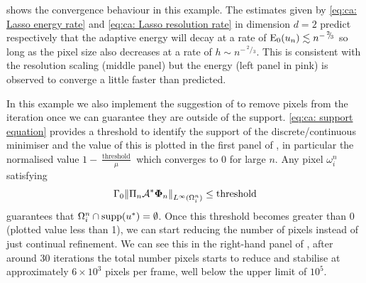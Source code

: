 \documentclass[10pt,a4paper,onecolumn]{article}
\numberwithin{equation}{section}
\newcommand{\norm}[1]{{\left\lVert #1 \right\rVert}}
\renewcommand{\sfrac}[2]{\,^{#1}\!\!/\!_{#2}}
\newcommand{\op}[1]{\operatorname{#1}}\newcommand{\overtext}[2]{\stackrel{\text{#1}}{#2}}
\renewcommand{\vec}{\mathbf}
\newcommand*{\Func}[1]{%
	\IfEqCase{#1}{%
		{0}{\op{E}}%
		{1}{\op{F}}%
		{2}{\op{G}}%
		{3}{\op{H}}%
	}[\op{F}#1]%
}
\newcommand*{\varf}[1]{%
	\IfEqCase{#1}{%
		{0}{u}%
		{1}{v}%
		{2}{w}%
	}[u#1]%
}
\newcommand*{\vard}[1]{%
	\IfEqCase{#1}{%
		{0}{\varphi}%
		{1}{\psi}%
	}[\varphi #1]%
}
\newcommand*{\vars}[1]{%
	\IfEqCase{#1}{%
		{0}{\alpha}%
		{1}{\beta}%
		{2}{\gamma}%
		{3}{a}%
		{4}{b}%
		{5}{c}%
	}[k#1]%
}
\newcommand*{\data}[1]{%
	\IfEqCase{#1}{%
		{0}{\eta}%
		{1}{\nu}%
	}[g]%
}
\newcommand{\domain}{\omega}
\newcommand{\meshsize}{h}
\newcommand*{\vvard}[1]{\vec{\vard{#1}}}\newcommand*{\vdata}[1]{\vec{\data{#1}}}
\begin{document}
 shows the convergence behaviour in this example. The estimates given by \eqref{eq:ca: Lasso energy rate} and \eqref{eq:ca: Lasso resolution rate} in dimension $d=2$ predict respectively that the adaptive energy will decay at a rate of $\Func0_0(\varf0_n)\lesssim n^{-\sfrac23}$ so long as the pixel size also decreases at a rate of $\meshsize\sim n^{-\sfrac23}$. This is consistent with the resolution scaling (middle panel) but the energy (left panel in pink) is observed to converge a little faster than predicted. 

In this example we also implement the suggestion of  to remove pixels from the iteration once we can guarantee they are outside of the support. \eqref{eq:ca: support equation} provides a threshold to identify the support of the discrete/continuous minimiser and the value of this is plotted in the first panel of , in particular the normalised value $1-\frac{\op{threshold}}{\mu}$ which converges to 0 for large $n$. Any pixel $\domain_i^n$ satisfying 
$$ \vars2_0\norm{\Pi_n\A^*\vvard0_n}_{L^\infty(\domain_i^n)} \leq \op{threshold}$$
guarantees that $\domain_i^n\cap\op{supp}(\varf0^*) = \emptyset$. Once this threshold becomes greater than 0 (plotted value less than 1), we can start reducing the number of pixels instead of just continual refinement. We can see this in the right-hand panel of , after around 30 iterations the total number pixels starts to reduce and stabilise at approximately $6\times10^3$ pixels per frame, well below the upper limit of $10^5$.
\end{document}
